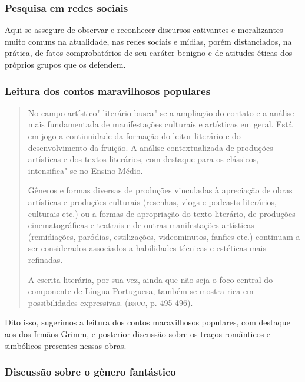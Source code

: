 \documentclass[12pt]{extarticle}
\begin{document}
\subsubsection{Pesquisa em redes sociais}


Aqui se assegure de observar e reconhecer discursos cativantes e
moralizantes muito comuns na atualidade, nas redes sociais e mídias,
porém distanciados, na prática, de fatos comprobatórios de seu caráter
benigno e de atitudes éticas dos próprios grupos que os defendem.

\subsubsection{Leitura dos contos maravilhosos populares}

\begin{quote}
No campo artístico"-literário busca"-se a ampliação do contato e a
análise mais fundamentada de manifestações culturais e artísticas em
geral. Está em jogo a continuidade da formação do leitor literário e do
desenvolvimento da fruição. A análise contextualizada de produções
artísticas e dos textos literários, com destaque para os clássicos,
intensifica"-se no Ensino Médio. 

Gêneros e formas diversas de produções
vinculadas à apreciação de obras artísticas e produções culturais
(resenhas, vlogs e podcasts literários, culturais etc.) ou a formas de
apropriação do texto literário, de produções cinematográficas e teatrais
e de outras manifestações artísticas (remidiações, paródias,
estilizações, videominutos, fanfics etc.) continuam a ser considerados
associados a habilidades técnicas e estéticas mais refinadas.

A escrita literária, por sua vez, ainda que não seja o foco central do
componente de Língua Portuguesa, também se mostra rica em possibilidades
expressivas. (\textsc{bncc}, p. 495-496).
\end{quote}

Dito isso, sugerimos a leitura dos contos maravilhosos populares, com
destaque aos dos Irmãos Grimm, e posterior discussão sobre os traços
românticos e simbólicos presentes nessas obras.


\subsubsection{Discussão sobre o gênero fantástico}
\end{document}

